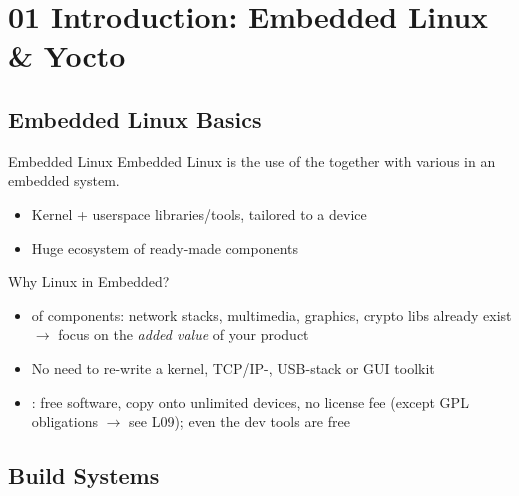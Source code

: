 \section{01 Introduction: Embedded Linux \& Yocto}

\subsection{Embedded Linux Basics}


\begin{concept}{Embedded Linux}
    Embedded Linux is the use of the  together with various
     in an embedded system.
    \begin{itemize}
        \item Kernel + userspace libraries/tools, tailored to a device
        \item Huge ecosystem of ready-made components
    \end{itemize}
\end{concept}

\begin{theorem}{Why Linux in Embedded?}
    \begin{itemize}
        \item {} of components: network stacks, multimedia,
              graphics, crypto libs already exist $\rightarrow$ focus on the
              \emph{added value} of your product
        \item No need to re-write a kernel, TCP/IP-, USB-stack or GUI toolkit
        \item {}: free software, copy onto unlimited devices,
              no license fee (except GPL obligations $\rightarrow$ see L09);
              even the dev tools are free
    \end{itemize}
\end{theorem}

\multend

\subsection{Build Systems}

